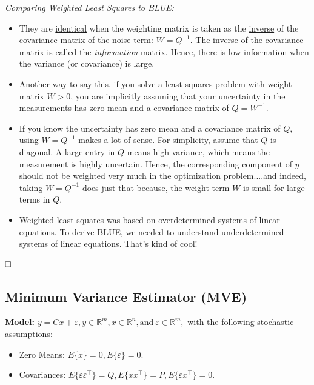 \begin{rem} \emph{Comparing Weighted Least Squares to BLUE:}
\begin{itemize}
    \item They are \ul{identical} when the weighting matrix is taken as the \ul{inverse} of the covariance matrix of the noise term: $W=Q^{-1}$. The inverse of the covariance matrix is called the \textit{information} matrix. Hence, there is low information when the variance (or covariance) is large.

        \item Another way to say this, if you solve a least squares problem with weight matrix $W>0$, you are implicitly assuming that your uncertainty in the measurements has zero mean and a covariance matrix of $Q=W^{-1}$.

            \item If you know the uncertainty has zero mean and a covariance matrix of $Q$, using $W=Q^{-1}$ makes a lot of sense. For simplicity, assume that $Q$ is diagonal. A large entry in $Q$ means high variance, which means the measurement is highly uncertain. Hence, the corresponding component of $y$ should not be weighted very much in the optimization problem....and indeed, taking $W=Q^{-1}$ does just that because, the weight term $W$ is small for large terms in $Q$.
            
            \item Weighted least squares was based on overdetermined systems of linear equations. To derive BLUE, we needed to understand  underdetermined systems of linear equations. That's kind of cool!
    \end{itemize}
       
$\hfill \square$  \end{rem}
    
 \subsection{Minimum Variance Estimator (MVE)}   
 
 \textbf{Model:} $y=Cx+\varepsilon, y\in \mathbb{R}^m, x \in \mathbb{R}^n, \text{and}~ \varepsilon\in \mathbb{R}^m,$ with the following stochastic assumptions:
 \begin{itemize}
     \item Zero Means: $E\{x\}=0, E\{\varepsilon\}= 0$. 
     \item Covariances: $E\{\varepsilon \varepsilon^\top \}=Q, E\{xx^\top \}= P, E\{\varepsilon x^\top \}=0$.
 \end{itemize}


